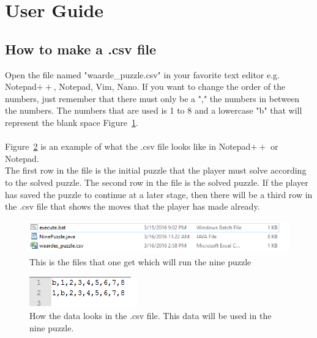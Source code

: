 \documentclass[10pt]{article}
\begin{document}
\section{User Guide}
\subsection{How to make a .csv file}
Open the file named "waarde\_puzzle.csv" in your favorite text editor e.g. Notepad$++$, Notepad, Vim, Nano.
If you want to change the order of the numbers, just remember that there must only be a "," the numbers in between the numbers. The numbers that are used is 1 to 8 and a lowercase "b" that will represent the blank space Figure~\ref{csv}.
\\
\\Figure~\ref{waardes} is an example of what the .csv file looks like in Notepad$++$ or Notepad. \\The first row in the file is the initial puzzle that the player must solve according to the solved puzzle. The second row in the file is the solved puzzle. If the player has saved the puzzle to continue at a later stage, then there will be a third row in the .csv file that shows the moves that the player has made already.
\begin{figure}
\centering
\includegraphics[scale=0.7]{./Prente/csv.png}
\caption{This is the files that one get which will run the nine puzzle}
\label{csv}
\end{figure}
\begin{figure}
\centering
\includegraphics[scale=1]{./Prente/waardes.png}
\caption{How the data looks in the .csv file. This data will be used in the nine puzzle.}
\label{waardes}
\end{figure}
\FloatBarrier
\end{document}
